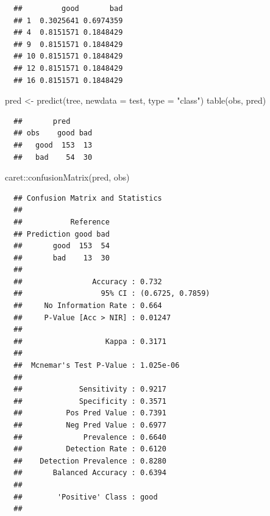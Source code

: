 \documentclass[
]{book}
\newenvironment{Shaded}{\begin{snugshade}}{\end{snugshade}}
\newcommand{\AttributeTok}[1]{\textcolor[rgb]{0.77,0.63,0.00}{#1}}
\newcommand{\FunctionTok}[1]{\textcolor[rgb]{0.00,0.00,0.00}{#1}}
\newcommand{\NormalTok}[1]{#1}
\newcommand{\OtherTok}[1]{\textcolor[rgb]{0.56,0.35,0.01}{#1}}
\newcommand{\SpecialCharTok}[1]{\textcolor[rgb]{0.00,0.00,0.00}{#1}}
\newcommand{\StringTok}[1]{\textcolor[rgb]{0.31,0.60,0.02}{#1}}
\theoremstyle{break}
\theoremstyle{nonumberplain}
\begin{document}
\begin{verbatim}
  ##         good       bad
  ## 1  0.3025641 0.6974359
  ## 4  0.8151571 0.1848429
  ## 9  0.8151571 0.1848429
  ## 10 0.8151571 0.1848429
  ## 12 0.8151571 0.1848429
  ## 16 0.8151571 0.1848429
\end{verbatim}

\begin{Shaded}
\begin{Highlighting}[]
\NormalTok{pred }\OtherTok{\textless{}{-}} \FunctionTok{predict}\NormalTok{(tree, }\AttributeTok{newdata =}\NormalTok{ test, }\AttributeTok{type =} \StringTok{"class"}\NormalTok{)}
\FunctionTok{table}\NormalTok{(obs, pred)}
\end{Highlighting}
\end{Shaded}

\begin{verbatim}
  ##       pred
  ## obs    good bad
  ##   good  153  13
  ##   bad    54  30
\end{verbatim}

\begin{Shaded}
\begin{Highlighting}[]
\NormalTok{caret}\SpecialCharTok{::}\FunctionTok{confusionMatrix}\NormalTok{(pred, obs)}
\end{Highlighting}
\end{Shaded}

\begin{verbatim}
  ## Confusion Matrix and Statistics
  ## 
  ##           Reference
  ## Prediction good bad
  ##       good  153  54
  ##       bad    13  30
  ##                                           
  ##                Accuracy : 0.732           
  ##                  95% CI : (0.6725, 0.7859)
  ##     No Information Rate : 0.664           
  ##     P-Value [Acc > NIR] : 0.01247         
  ##                                           
  ##                   Kappa : 0.3171          
  ##                                           
  ##  Mcnemar's Test P-Value : 1.025e-06       
  ##                                           
  ##             Sensitivity : 0.9217          
  ##             Specificity : 0.3571          
  ##          Pos Pred Value : 0.7391          
  ##          Neg Pred Value : 0.6977          
  ##              Prevalence : 0.6640          
  ##          Detection Rate : 0.6120          
  ##    Detection Prevalence : 0.8280          
  ##       Balanced Accuracy : 0.6394          
  ##                                           
  ##        'Positive' Class : good            
  ## 
\end{verbatim}
\end{document}
